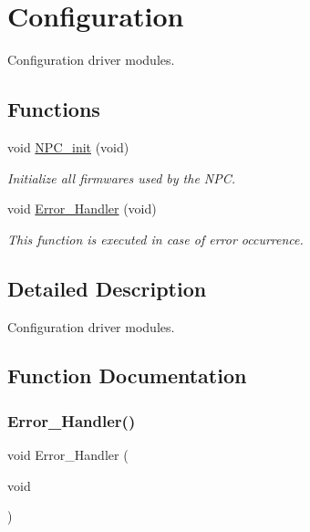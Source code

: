 \hypertarget{group___configuration}{}\section{Configuration}
\label{group___configuration}


Configuration driver modules.  


\subsection*{Functions}
\begin{DoxyCompactItemize}
\item 
void \hyperlink{group___configuration_gabe73c51b6f7ce590321d186bef079fe4}{N\+P\+C\+\_\+init} (void)
\begin{DoxyCompactList}\small\item\em Initialize all firmwares used by the N\+PC. \end{DoxyCompactList}\item 
void \hyperlink{group___configuration_ga1730ffe1e560465665eb47d9264826f9}{Error\+\_\+\+Handler} (void)
\begin{DoxyCompactList}\small\item\em This function is executed in case of error occurrence. \end{DoxyCompactList}\end{DoxyCompactItemize}


\subsection{Detailed Description}
Configuration driver modules. 



\subsection{Function Documentation}
\mbox{\label{group___configuration_ga1730ffe1e560465665eb47d9264826f9}} 
\subsubsection{\texorpdfstring{Error\+\_\+\+Handler()}{Error\_Handler()}}
{\footnotesize\ttfamily void Error\+\_\+\+Handler (\begin{DoxyParamCaption}\item[{void}]{ }\end{DoxyParamCaption})}



